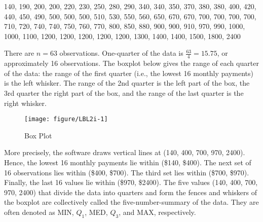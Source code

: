 \documentclass[11pt]{book}\usepackage[]{graphicx}\usepackage[]{color}
\begin{document}
{\small{
140, 190, 200, 200, 220, 230, 250, 280, 290, 340, 340, 350, 370, 380, 380, 400, 420, 440, 450, 490, 500, 500, 500, 510, 530, 550, 560, 650, 670, 670, 700, 700, 700, 700, 710, 720, 740, 740, 750, 760, 770, 800, 850, 880, 900, 900, 910, 970, 990, 1000, 1000, 1100, 1200, 1200, 1200, 1200, 1200, 1300, 1400, 1400, 1500, 1800, 2400
}}

There are $n = 63$ observations.  One-quarter of the data is $\frac{63}{4}=15.75$, or approximately 16 observations.  The boxplot below gives the range of each quarter of the data: the range of the first quarter (i.e., the lowest 16 monthly payments) is the left whisker.  The range of the 2nd quarter is the left part of the box, the 3rd quarter the right part of the box, and the range of the last quarter is the right whisker.   

\begin{figure}[ht]

\caption{Box Plot }



{\centering \texttt{[image: figure/LBL2i-1]} 

}




\end{figure}

More precisely, the software draws vertical lines at (140, 400, 700, 970, 2400).  Hence, the lowest 16 monthly payments lie within (\$140, \$400).  The next set of 16 observations lies within (\$400, \$700).  The third set lies within (\$700, \$970).  Finally, the last 16 values lie within (\$970, \$2400).  The five values (140, 400, 700, 970, 2400) that divide the data into quarters and form the fences and whiskers of the boxplot are collectively called the five-number-summary of the data.  They are often denoted as MIN, $Q_1$, MED, $Q_3$, and MAX, respectively.

\newpage
\end{document}
